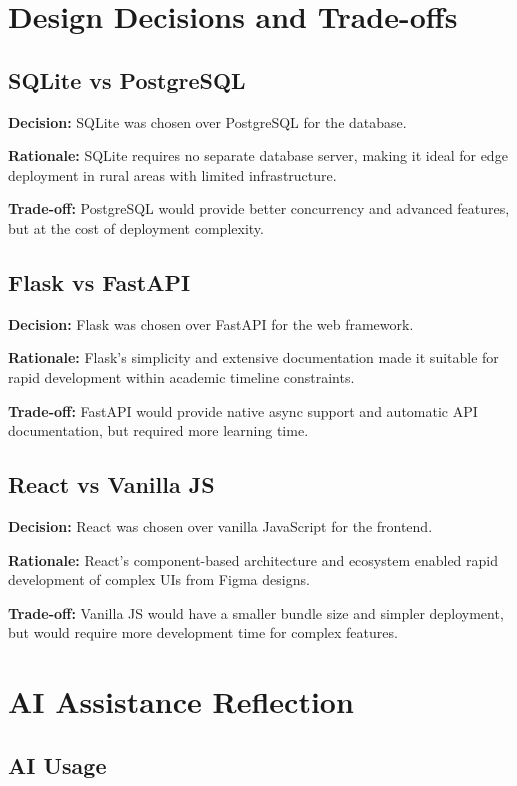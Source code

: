 \section{Design Decisions and Trade-offs}

\subsection{SQLite vs PostgreSQL}

\textbf{Decision:} SQLite was chosen over PostgreSQL for the database.

\textbf{Rationale:} SQLite requires no separate database server, making it ideal for edge deployment in rural areas with limited infrastructure.

\textbf{Trade-off:} PostgreSQL would provide better concurrency and advanced features, but at the cost of deployment complexity.

\subsection{Flask vs FastAPI}

\textbf{Decision:} Flask was chosen over FastAPI for the web framework.

\textbf{Rationale:} Flask's simplicity and extensive documentation made it suitable for rapid development within academic timeline constraints.

\textbf{Trade-off:} FastAPI would provide native async support and automatic API documentation, but required more learning time.

\subsection{React vs Vanilla JS}

\textbf{Decision:} React was chosen over vanilla JavaScript for the frontend.

\textbf{Rationale:} React's component-based architecture and ecosystem enabled rapid development of complex UIs from Figma designs.

\textbf{Trade-off:} Vanilla JS would have a smaller bundle size and simpler deployment, but would require more development time for complex features.

\section{AI Assistance Reflection}

\subsection{AI Usage}

